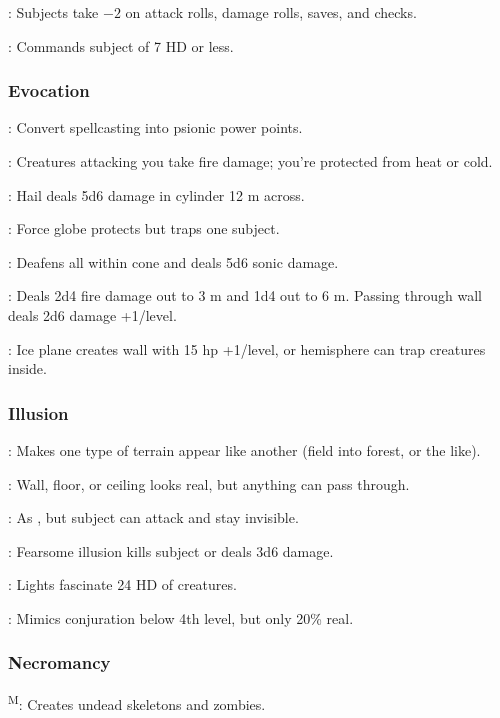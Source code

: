 	: Subjects take $-2$ on attack rolls, damage rolls, saves, and checks.

	: Commands subject of 7 HD or less.

\subsubsection{Evocation}
	: Convert spellcasting into psionic power points.

	: Creatures attacking you take fire damage; you're protected from heat or cold.

	: Hail deals 5d6 damage in cylinder 12 m across.

	: Force globe protects but traps one subject.

	: Deafens all within cone and deals 5d6 sonic damage.

	: Deals 2d4 fire damage out to 3 m and 1d4 out to 6 m. Passing through wall deals 2d6 damage +1/level.

	: Ice plane creates wall with 15 hp +1/level, or hemisphere can trap creatures inside.

\subsubsection{Illusion}
	: Makes one type of terrain appear like another (field into forest, or the like).

	: Wall, floor, or ceiling looks real, but anything can pass through.

	: As , but subject can attack and stay invisible.

	: Fearsome illusion kills subject or deals 3d6 damage.

	: Lights fascinate 24 HD of creatures.

	: Mimics conjuration below 4th level, but only 20\% real.

\subsubsection{Necromancy}
	\textsuperscript{M}: Creates undead skeletons and zombies.

